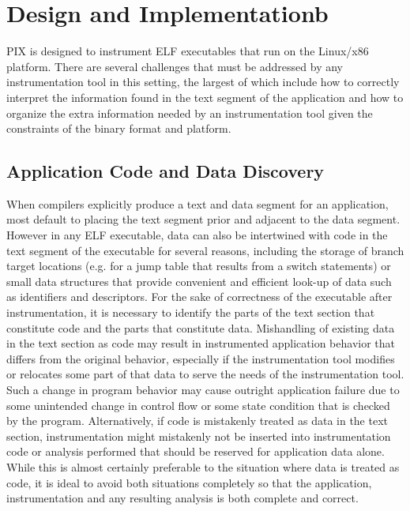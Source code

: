 \section{Design and Implementationb}

PIX is designed to instrument ELF executables that run on the Linux/x86 platform.
There are several challenges that must be
addressed by any instrumentation tool in this setting, the largest of which include how to correctly
interpret the information found in the text segment of the application and how to organize the
extra information needed by an instrumentation tool given the constraints of the binary format
and platform.

\subsection{Application Code and Data Discovery}
When compilers explicitly produce a text and data segment for an application,
most default to placing the text segment prior and adjacent to the data segment.
However in any ELF executable, data can also be intertwined with code in the text segment of the executable for several reasons, including
the storage of branch target locations (e.g. for a jump table that results from a switch statements) or small data structures 
that provide convenient and efficient look-up of data such as identifiers and descriptors. 
For the sake of correctness of the executable after instrumentation, it is necessary to identify the parts of the text 
section that constitute code and the parts that constitute data. Mishandling of existing data in the text section as code 
may result in instrumented application behavior that differs from the original behavior, especially 
if the instrumentation tool modifies or relocates some part of that data 
to serve the needs of the instrumentation tool. 
Such a change in program behavior may cause outright application failure due to some unintended change in control flow 
or some state condition that is checked by the program.
Alternatively, if code is mistakenly treated as data in the text section, instrumentation might
mistakenly not be inserted into instrumentation code or analysis performed that should be reserved for
application data alone. While this is almost certainly preferable to the situation where data is treated as code, it
is ideal to avoid both situations completely so that the application, 
instrumentation and any resulting analysis is both complete and correct.


